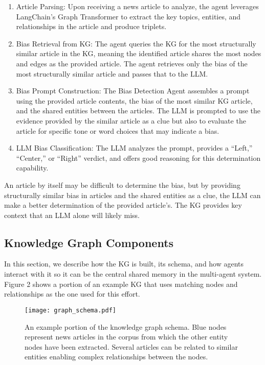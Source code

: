 \documentclass[11pt]{article}
\begin{document}
\begin{enumerate}
\item Article Parsing: Upon receiving a news article to analyze, the agent leverages LangChain’s Graph Transformer to extract the key topics, entities, and relationships in the article and produce triplets.
    
    \item Bias Retrieval from KG: The agent queries the KG for the most structurally similar article in the KG, meaning the identified article shares the most nodes and edges as the provided article. The agent retrieves only the bias of the most structurally similar article and passes that to the LLM.
    
    \item Bias Prompt Construction: The Bias Detection Agent assembles a prompt using the provided article contents, the bias of the most similar KG article, and the shared entities between the articles. The LLM is prompted to use the evidence provided by the similar article as a clue but also to evaluate the article for specific tone or word choices that may indicate a bias.
    
    \item  LLM Bias Classification: The LLM analyzes the prompt, provides a “Left,” “Center,” or “Right” verdict, and offers good reasoning for this determination capability.
\end{enumerate}

An article by itself may be difficult to determine the bias, but by providing structurally similar bias in articles and the shared entities as a clue, the LLM can make a better determination of the provided article’s. The KG provides key context that an LLM alone will likely miss.

\subsection{Knowledge Graph Components}
In this section, we describe how the KG is built, its schema, and how agents interact with it so it can be the central shared memory in the multi-agent system. Figure 2 shows a portion of an example KG that uses matching nodes and relationships as the one used for this effort. 
\begin{figure}[h!]
\begin{center}

\hspace*{-2cm}    
\texttt{[image: graph\_schema.pdf]}

\end{center}
\caption{An example portion of the knowledge graph schema. Blue nodes represent news articles in the corpus from which the other entity nodes have been extracted. Several articles can be related to similar entities enabling complex relationships between the nodes.
}
\label{setup}
\end{figure}
\end{document}
